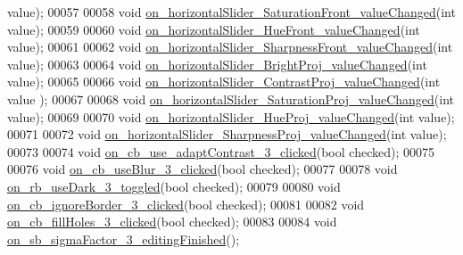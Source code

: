 \begin{DoxyCode}
      value);
00057 
00058   \textcolor{keywordtype}{void} \hyperlink{class_dialog_settings_a7d58b34cefab1de3cda64b0cc83f40a4}{on\_horizontalSlider\_SaturationFront\_valueChanged}(\textcolor{keywordtype}{int}
       value);
00059 
00060   \textcolor{keywordtype}{void} \hyperlink{class_dialog_settings_ad058e3bb68bde789b767cd1a9d7a59d3}{on\_horizontalSlider\_HueFront\_valueChanged}(\textcolor{keywordtype}{int} value);
00061 
00062   \textcolor{keywordtype}{void} \hyperlink{class_dialog_settings_adf1f4d3c4ff223c4c183ae271819fc8c}{on\_horizontalSlider\_SharpnessFront\_valueChanged}(\textcolor{keywordtype}{int} 
      value);
00063 
00064   \textcolor{keywordtype}{void} \hyperlink{class_dialog_settings_ade5e4c2418d4356e0776fbb000757c80}{on\_horizontalSlider\_BrightProj\_valueChanged}(\textcolor{keywordtype}{int} value);
00065 
00066   \textcolor{keywordtype}{void} \hyperlink{class_dialog_settings_a2f1a2b46e08ed3e6a99b6e3108879002}{on\_horizontalSlider\_ContrastProj\_valueChanged}(\textcolor{keywordtype}{int} value
      );
00067 
00068   \textcolor{keywordtype}{void} \hyperlink{class_dialog_settings_ac3d7c7b3ea9f5a0e3c39b924556f5ea2}{on\_horizontalSlider\_SaturationProj\_valueChanged}(\textcolor{keywordtype}{int} 
      value);
00069 
00070   \textcolor{keywordtype}{void} \hyperlink{class_dialog_settings_a14f0a0e04c6eac16c0964b0799bad307}{on\_horizontalSlider\_HueProj\_valueChanged}(\textcolor{keywordtype}{int} value);
00071 
00072   \textcolor{keywordtype}{void} \hyperlink{class_dialog_settings_ac1eb97de9fde47bdb9841b52724663a7}{on\_horizontalSlider\_SharpnessProj\_valueChanged}(\textcolor{keywordtype}{int} 
      value);
00073 
00074   \textcolor{keywordtype}{void} \hyperlink{class_dialog_settings_a245bc00aa16dfc97577fe2db8c1e1036}{on\_cb\_use\_adaptContrast\_3\_clicked}(\textcolor{keywordtype}{bool} checked);
00075 
00076   \textcolor{keywordtype}{void} \hyperlink{class_dialog_settings_a71f71044299e80f1c520e529fd67df43}{on\_cb\_useBlur\_3\_clicked}(\textcolor{keywordtype}{bool} checked);
00077 
00078   \textcolor{keywordtype}{void} \hyperlink{class_dialog_settings_af1577c6b225da64f565ad23528e538bf}{on\_rb\_useDark\_3\_toggled}(\textcolor{keywordtype}{bool} checked);
00079 
00080   \textcolor{keywordtype}{void} \hyperlink{class_dialog_settings_a2f1a496fde19c1728e0cc9eec30c304d}{on\_cb\_ignoreBorder\_3\_clicked}(\textcolor{keywordtype}{bool} checked);
00081 
00082   \textcolor{keywordtype}{void} \hyperlink{class_dialog_settings_a020f004b906e659d4ba2920281112afa}{on\_cb\_fillHoles\_3\_clicked}(\textcolor{keywordtype}{bool} checked);
00083 
00084   \textcolor{keywordtype}{void} \hyperlink{class_dialog_settings_a1a907ca905e313fe606b84b80829f80b}{on\_sb\_sigmaFactor\_3\_editingFinished}();

\end{DoxyCode}
